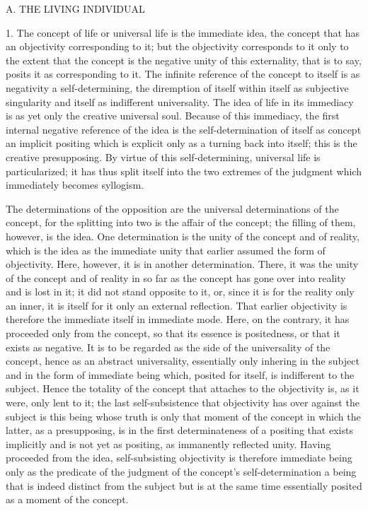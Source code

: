 
A. THE LIVING INDIVIDUAL

1. The concept of life or universal life is the immediate idea, the concept that
has an objectivity corresponding to it; but the objectivity corresponds to it
only to the extent that the concept is the negative unity of this externality,
that is to say, posits it as corresponding to it. The infinite reference of
the concept to itself is as negativity a self-determining, the diremption of
itself within itself as subjective singularity and itself as indifferent universality.
The idea of life in its immediacy is as yet only the creative universal soul.
Because of this immediacy, the first internal negative reference of the idea
is the self-determination of itself as concept
 an implicit positing which is
explicit only as a turning back into itself; this is the creative presupposing.
By virtue of this self-determining, universal life is particularized; it has
thus split itself into the two extremes of the judgment which immediately
becomes syllogism.

The determinations of the opposition are the universal determinations
of the concept, for the splitting into two is the affair of the concept; the
filling of them, however, is the idea. One determination is the unity of
the concept and of reality, which is the idea as the immediate unity that
earlier assumed the form of objectivity. Here, however, it is in another
determination. There, it was the unity of the concept and of reality in
so far as the concept has gone over into reality and is lost in it; it did
not stand opposite to it, or, since it is for the reality only an inner, it is
itself for it only an external reflection. That earlier objectivity is therefore
the immediate itself in immediate mode. Here, on the contrary, it has
proceeded only from the concept, so that its essence is positedness, or that
it exists as negative.
 It is to be regarded as the side of the universality of
the concept, hence as an abstract universality, essentially only inhering in
the subject and in the form of immediate being which, posited for itself, is
indifferent to the subject. Hence the totality of the concept that attaches
to the objectivity is, as it were, only lent to it; the last self-subsistence that
objectivity has over against the subject is this being whose truth is only
that moment of the concept in which the latter, as a presupposing, is in the
first determinateness of a positing that exists implicitly and is not yet as
positing, as immanently reflected unity. Having proceeded from the idea,
self-subsisting objectivity is therefore immediate being only as the predicate
of the judgment of the concept's self-determination
 a being that is indeed
distinct from the subject but is at the same time essentially posited as a
moment of the concept.

